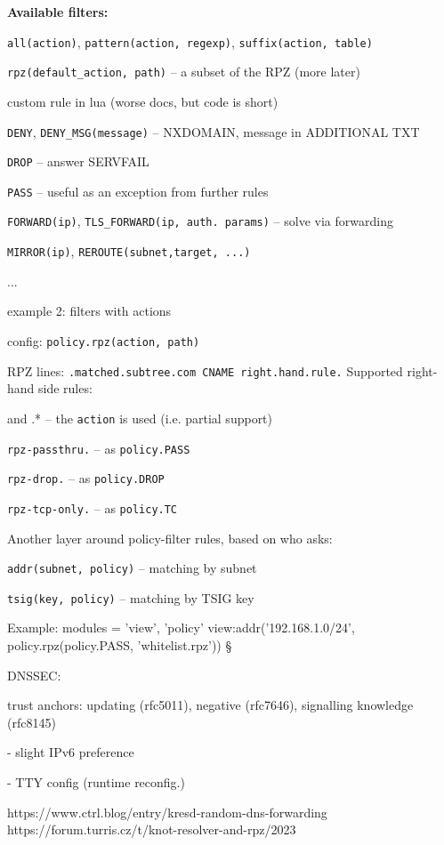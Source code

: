{\bf Available filters:}
\bulletList
\item {\tt all(action)}, {\tt pattern(action, regexp)}, {\tt suffix(action, table)}
\item {\tt rpz(default\_action, path)} -- a subset of the RPZ (more later)
\item custom rule in lua (worse docs, but code is short)
\endBulletList

\bulletList
\item {\tt DENY}, {\tt DENY\_MSG(message)} -- NXDOMAIN, message in ADDITIONAL TXT
\item {\tt DROP} -- answer SERVFAIL
\item {\tt PASS} -- useful as an exception from further rules
\item {\tt FORWARD(ip)}, {\tt TLS\_FORWARD(ip, auth. params)} -- solve via forwarding
\item {\tt MIRROR(ip)}, {\tt REROUTE({{subnet,target}, ...})}
\item ...
\item {\tti example 2:} filters with actions
\endBulletList

\bulletList
\item config: {\tt policy.rpz(action, path)} \par
\item RPZ lines: {\tt *.matched.subtree.com CNAME right.hand.rule.}
\endBulletList
Supported right-hand side rules:
\bulletList
\item * and .* -- the {\tt action} is used (i.e. partial support)
\item {\tt rpz-passthru.} -- as {\tt policy.PASS}
\item {\tt rpz-drop.} -- as {\tt policy.DROP}
\item {\tt rpz-tcp-only.} -- as {\tt policy.TC}
\endBulletList


Another layer around policy-filter rules,
based on \cznicred who \endCol asks:
\bulletList
\item {\tt addr(subnet, policy)} -- matching by subnet
\item {\tt tsig(key, policy)} -- matching by TSIG key
\endBulletList
\par
Example:
\verbatim
modules = { 'view', 'policy' }
view:addr('192.168.1.0/24', policy.rpz(policy.PASS, 'whitelist.rpz'))
§



\bye


\slide
DNSSEC:
\item trust anchors: updating (rfc5011), negative (rfc7646), signalling knowledge (rfc8145)

- slight IPv6 preference

- TTY config (runtime reconfig.)

https://www.ctrl.blog/entry/kresd-random-dns-forwarding
https://forum.turris.cz/t/knot-resolver-and-rpz/2023



